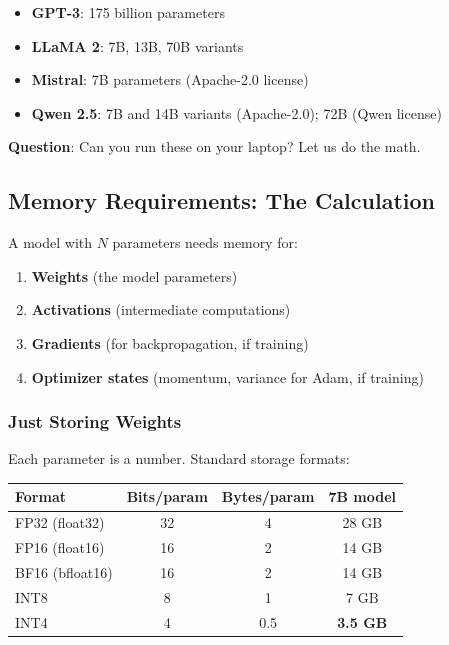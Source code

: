 \documentclass{article}
\begin{document}
\begin{itemize}
\item \textbf{GPT-3}: 175 billion parameters
\item \textbf{LLaMA 2}: 7B, 13B, 70B variants
\item \textbf{Mistral}: 7B parameters (Apache-2.0 license)
\item \textbf{Qwen 2.5}: 7B and 14B variants (Apache-2.0); 72B (Qwen license)
\end{itemize}

\textbf{Question}: Can you run these on your laptop? Let us do the math.

\subsection{Memory Requirements: The Calculation}

A model with $N$ parameters needs memory for:
\begin{enumerate}
\item \textbf{Weights} (the model parameters)
\item \textbf{Activations} (intermediate computations)
\item \textbf{Gradients} (for backpropagation, if training)
\item \textbf{Optimizer states} (momentum, variance for Adam, if training)
\end{enumerate}

\subsubsection{Just Storing Weights}

Each parameter is a number. Standard storage formats:

\begin{center}
\begin{tabular}{lccc}
\toprule
\textbf{Format} & \textbf{Bits/param} & \textbf{Bytes/param} & \textbf{7B model} \\
\midrule
FP32 (float32) & 32 & 4 & 28 GB \\
FP16 (float16) & 16 & 2 & 14 GB \\
BF16 (bfloat16) & 16 & 2 & 14 GB \\
INT8 & 8 & 1 & 7 GB \\
INT4 & 4 & 0.5 & \textbf{3.5 GB} \\
\bottomrule
\end{tabular}
\end{center}
\end{document}
